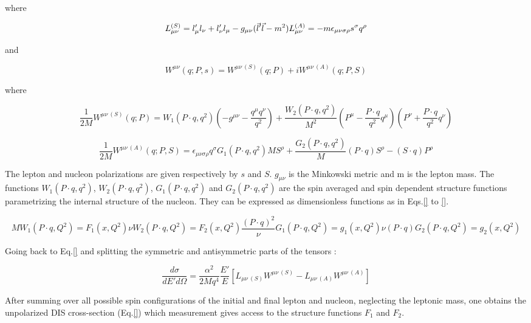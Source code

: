 where

\begin{equation}
  L^{(S)}_{\mu\nu} = l_{\mu}'l_{\nu} + l_{\nu}'l_{\mu} - g_{\mu\nu}(\vec{l}'\vec{l}-m^2) \\
  L^{(A)}_{\mu\nu} = -m\epsilon_{\mu\nu\sigma\rho}s^{\sigma}q^{\rho}
\end{equation}

and

\begin{equation}
  W^{\mu\nu}(q;P,s) = W^{\mu\nu\ (S)}(q;P) + iW^{\mu\nu\ (A)}(q;P,S)
\end{equation}

where

\begin{equation}
  \frac{1}{2M}W^{\mu\nu\ (S)}(q;P) = W_1(P\cdot q,q^2)(-g^{\mu\nu}-\frac{q^{\mu}q^{\nu}}{q^2})+\frac{W_2(P\cdot q,q^2)}{M^2}(P^{\mu}-\frac{P\cdot q}{q^2}q^{\mu})(P^{\nu}+\frac{P\cdot q}{q^2}q^{\nu})
\end{equation}

\begin{equation}
  \frac{1}{2M}W^{\mu\nu\ (A)}(q;P,S) = \epsilon_{\mu\nu\sigma\rho}q^{\sigma}{G_1(P\cdot q,q^2)MS^{\rho}+\frac{G_2(P\cdot q,q^2)}{M}(P\cdot q)S^{\rho}-(S\cdot q)P^{\rho}}
\end{equation}

The lepton and nucleon polarizations are given respectively by $s$ and $S$. $g_{\mu\nu}$ is the
Minkowski metric and m is the lepton mass. The functions $W_1(P\cdot q,q^2)$, $W_2(P\cdot q,q^2)$,
$G_1(P\cdot q,q^2)$ and $G_2(P\cdot q,q^2)$ are the spin averaged and spin dependent structure functions
parametrizing the internal structure of the nucleon. They can be expressed as dimensionless functions as
in Eqs.\ref{} to \ref{}.

\begin{equation}
  MW_1(P\cdot q,Q^2)=F_1(x,Q^2)
  \nu W_2(P\cdot q,Q^2)=F_2(x,Q^2)
  \frac{(P\cdot q)^2}{\nu}G_1(P\cdot q,Q^2)=g_1(x,Q^2)
  \nu(P\cdot q)G_2(P\cdot q,Q^2)=g_2(x,Q^2)
\end{equation}

Going back to Eq.\ref{} and splitting the symmetric and antisymmetric parts of the tensors :

\begin{equation}
  \frac{d\sigma}{dE'd\Omega} = \frac{\alpha^2}{2Mq^4}\frac{E'}{E}[L_{\mu\nu\ (S)}W^{\mu\nu\ (S)}-L_{\mu\nu\ (A)}W^{\mu\nu\ (A)}]
\end{equation}

After summing over all possible spin configurations of the initial and final lepton and nucleon, neglecting
the leptonic mass, one obtains the unpolarized DIS cross-section (Eq.\ref{}) which measurement gives access
to the structure functions $F_1$ and $F_2$.

